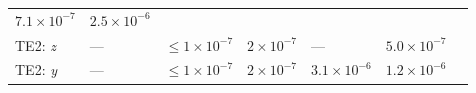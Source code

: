 \documentclass[DM,lsstdraft,toc]{lsstdoc}
\begin{document}
\begin{longtable}[]{@{}lllllll@{}}
\begin{minipage}[t]{0.12\columnwidth}
\(7.1\times10^{-7}\)\strut
\end{minipage} & \begin{minipage}[t]{0.12\columnwidth}\raggedright\strut
\(2.5\times10^{-6}\)\strut
\end{minipage} & \begin{minipage}[t]{0.17\columnwidth}\raggedright\strut
\strut
\end{minipage}\tabularnewline
\begin{minipage}[t]{0.12\columnwidth}\raggedright\strut
TE2: \emph{z}\strut
\end{minipage} & \begin{minipage}[t]{0.06\columnwidth}\raggedright\strut
---\strut
\end{minipage} & \begin{minipage}[t]{0.14\columnwidth}\raggedright\strut
\(\leq 1\times10^{-7}\)\strut
\end{minipage} & \begin{minipage}[t]{0.14\columnwidth}\raggedright\strut
\(2\times10^{-7}\)\strut
\end{minipage} & \begin{minipage}[t]{0.12\columnwidth}\raggedright\strut
---\strut
\end{minipage} & \begin{minipage}[t]{0.12\columnwidth}\raggedright\strut
\(5.0\times10^{-7}\)\strut
\end{minipage} & \begin{minipage}[t]{0.17\columnwidth}\raggedright\strut
\strut
\end{minipage}\tabularnewline
\begin{minipage}[t]{0.12\columnwidth}\raggedright\strut
TE2: \emph{y}\strut
\end{minipage} & \begin{minipage}[t]{0.06\columnwidth}\raggedright\strut
---\strut
\end{minipage} & \begin{minipage}[t]{0.14\columnwidth}\raggedright\strut
\(\leq 1\times10^{-7}\)\strut
\end{minipage} & \begin{minipage}[t]{0.14\columnwidth}\raggedright\strut
\(2\times10^{-7}\)\strut
\end{minipage} & \begin{minipage}[t]{0.12\columnwidth}\raggedright\strut
\(3.1\times10^{-6}\)\strut
\end{minipage} & \begin{minipage}[t]{0.12\columnwidth}\raggedright\strut
\(1.2\times10^{-6}\)\strut
\end{minipage} & \begin{minipage}[t]{0.17\columnwidth}\raggedright\strut
\strut
\end{minipage}\tabularnewline
\bottomrule
\end{longtable}
\end{document}
